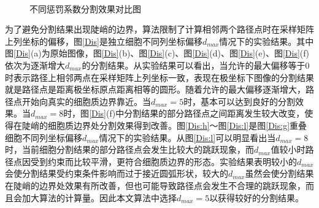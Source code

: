 \documentclass[nomlist,masters]{seuthesix}
\begin{document}
\begin{figure}[H]
\centering 
\hspace{0.01\textwidth}
\hspace{0.01\textwidth}
\vfill
\centering 
\hspace{0.01\textwidth}
\hspace{0.01\textwidth}
\caption{不同惩罚系数分割效果对比图}
\label{weight}
\end{figure}

为了避免分割结果出现陡峭的边界，算法限制了计算相邻两个路径点时在采样矩阵上列坐标的偏移，图\ref{Dis}是独立细胞不同列坐标偏移$d_{max}$情况下的实验结果。其中图\ref{Dis}(a)为原始图像，图\ref{Dis}(b)、图\ref{Dis}(c)、图\ref{Dis}(d)、图\ref{Dis}(e)、图\ref{Dis}(f)依次为逐渐增大$d_{max}$的分割结果。从实验结果可以看出，当允许的最大偏移等于0时表示路径上相邻两点在采样矩阵上列坐标一致，表现在极坐标下图像的分割结果就是路径点是距离极坐标原点距离相等的圆形。随着允许的最大偏移逐渐增大，路径点开始向真实的细胞质边界靠近。当$d_{max}=5$时，基本可以达到良好的分割效果。当$d_{max}=8$时，图\ref{Dis}(f)中分割结果的部分路径点之间距离发生较大改变，使得在陡峭的细胞质边界处分割效果得到改善。图\ref{Dis:h}～图\ref{Dis:l}是图\ref{Dis:g}重叠细胞不同列坐标偏移$d_{max}$情况下的实验结果。从图\ref{Dis:l}可以明显看出当$d_{max}=8$时，当前细胞分割结果的部分路径点会发生比较大的跳跃现象，而$d_{max}$值较小时路径点因受到约束而比较平滑，更符合细胞质边界的形态。实验结果表明较小的$d_{max}$会使分割结果受约束条件影响而过于接近圆弧形状，较大的$d_{max}$虽然会使分割结果在陡峭的边界处效果有所改善，但也可能导致路径点会发生不合理的跳跃现象，而且会加大算法的计算量。因此本文算法中选择$d_{max}=5$以获得较好的分割结果。
\end{document}

